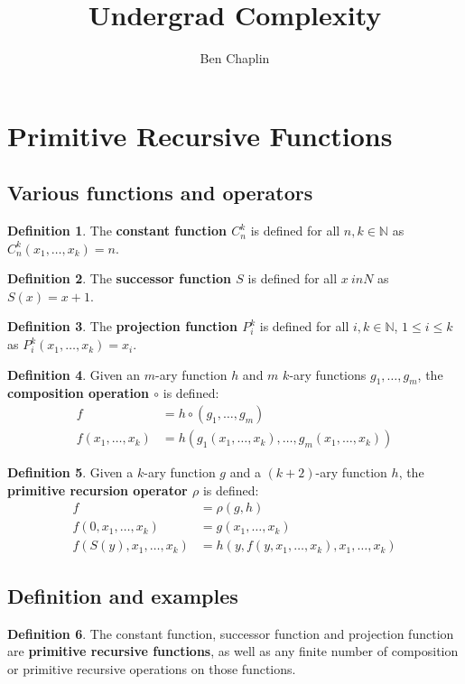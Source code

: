 \documentclass[11pt]{article}
\title{Undergrad Complexity}
\author{Ben Chaplin}
\date{}
\theoremstyle{plain}
\theoremstyle{definition}
\newtheorem*{defn}{Definition}
\newcommand{\N}{\mathbb{N}}
\begin{document}
\maketitle
\tableofcontents

\section{Primitive Recursive Functions}
\subsection{Various functions and operators}

\begin{defn}
	The {\bf constant function $C^k_n$} is defined for all $n, k \in \N$ as $C^k_n(x_1, \ldots, x_k) = n$.
\end{defn}

\begin{defn}
	The {\bf successor function $S$} is defined for all $x \ in N$ as $S(x) = x + 1$.
\end{defn}

\begin{defn}
	The {\bf projection function $P^k_i$} is defined for all $i, k \in \N$, $1 \leq i \leq k$ as
	$P^k_i(x_1, \ldots, x_k) = x_i$.
\end{defn}

\begin{defn}
	Given an $m$-ary function $h$ and $m$ $k$-ary functions $g_1, \ldots, g_m$, the {\bf composition operation $\circ$}
	is defined:
	\begin{align*}
		f                   & = h \circ (g_1, \ldots, g_m)                              \\
		f(x_1, \ldots, x_k) & = h(g_1(x_1, \ldots, x_k), \ldots, g_m(x_1, \ldots, x_k))
	\end{align*}
\end{defn}

\begin{defn}
	Given a $k$-ary function $g$ and a $(k + 2)$-ary function $h$, the {\bf primitive recursion operator $\rho$} is defined:
	\begin{align*}
		f                         & = \rho(g, h)                                     \\
		f(0, x_1, \ldots, x_k)    & = g(x_1, \ldots, x_k)                            \\
		f(S(y), x_1, \ldots, x_k) & = h(y, f(y, x_1, \ldots, x_k), x_1, \ldots, x_k)
	\end{align*}
\end{defn}

\subsection{Definition and examples}

\begin{defn}
	The constant function, successor function and projection function are {\bf primitive recursive functions}, as well as
	any finite number of composition or primitive recursive operations on those functions.
\end{defn}
\end{document}
